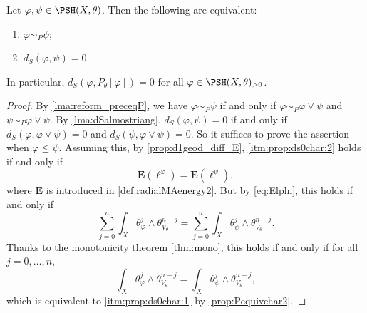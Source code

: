 \begin{proposition}\label{prop:ds0char}
    Let $\varphi,\psi\in \PSH(X,\theta)$. Then the following are equivalent:
    \begin{enumerate}
        \item\label{itm:prop:ds0char:1} $\varphi\sim_P \psi$;
        \item\label{itm:prop:ds0char:2} $d_S(\varphi,\psi)=0$.
    \end{enumerate}

    In particular, $d_S(\varphi,P_{\theta}[\varphi])=0$ for all $\varphi\in \PSH(X,\theta)_{>0}$.
\end{proposition}
\begin{proof}
    By \cref{lma:reform_preceqP}, we have $\varphi\sim_P \psi$ if and only if $\varphi\sim_P \varphi\lor \psi$ and $\psi\sim_P \varphi\lor \psi$. By \cref{lma:dSalmostriang}, $d_S(\varphi,\psi)=0$ if and only if $d_S(\varphi,\varphi\lor \psi)=0$ and $d_S(\psi,\varphi\lor \psi)=0$. So it suffices to prove the assertion when $\varphi\leq \psi$. Assuming this, by \cref{prop:d1geod_diff_E}, \ref{itm:prop:ds0char:2} holds if and only if
    \[
        \mathbf{E}\left(\ell^{\varphi}\right)=  \mathbf{E}\left(\ell^{\psi}\right),
    \]
    where $\mathbf{E}$ is introduced in \cref{def:radialMAenergy2}.
    But by \eqref{eq:Elphi}, this holds if and only if
    \[
        \sum_{j=0}^n \int_X \theta_{\varphi}^j\wedge \theta_{V_{\theta}}^{n-j}=\sum_{j=0}^n \int_X \theta_{\psi}^j\wedge \theta_{V_{\theta}}^{n-j}.
    \]
    Thanks to the monotonicity theorem \cref{thm:mono}, this holds if and only if for all $j=0,\ldots,n$,
    \[
        \int_X \theta_{\varphi}^j\wedge \theta_{V_{\theta}}^{n-j}=\int_X \theta_{\psi}^j\wedge \theta_{V_{\theta}}^{n-j},
    \]
    which is equivalent to \ref{itm:prop:ds0char:1} by \cref{prop:Pequivchar2}.
\end{proof}


